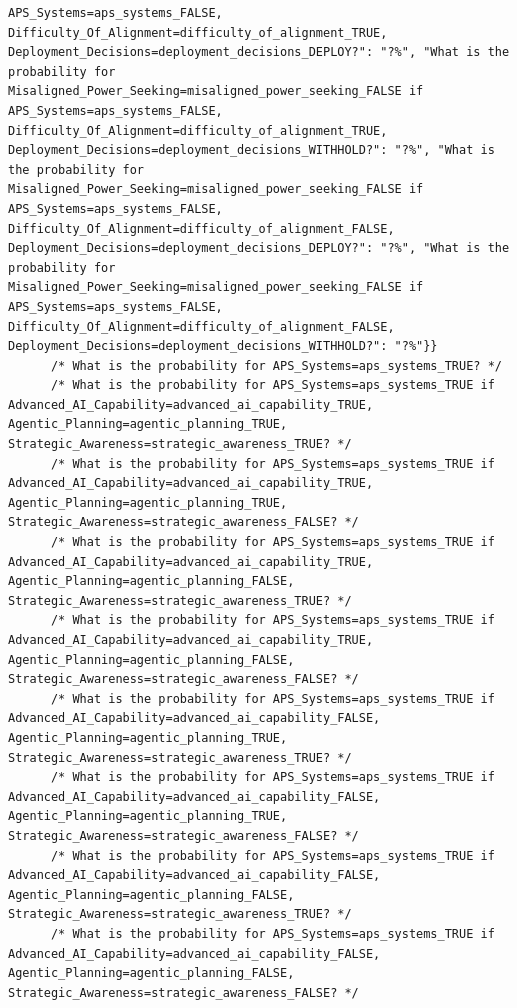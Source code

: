 \documentclass[
  11pt,
  letterpaper,
]{book}
\begin{document}
\begin{verbatim}
APS_Systems=aps_systems_FALSE, Difficulty_Of_Alignment=difficulty_of_alignment_TRUE, Deployment_Decisions=deployment_decisions_DEPLOY?": "?%", "What is the probability for Misaligned_Power_Seeking=misaligned_power_seeking_FALSE if APS_Systems=aps_systems_FALSE, Difficulty_Of_Alignment=difficulty_of_alignment_TRUE, Deployment_Decisions=deployment_decisions_WITHHOLD?": "?%", "What is the probability for Misaligned_Power_Seeking=misaligned_power_seeking_FALSE if APS_Systems=aps_systems_FALSE, Difficulty_Of_Alignment=difficulty_of_alignment_FALSE, Deployment_Decisions=deployment_decisions_DEPLOY?": "?%", "What is the probability for Misaligned_Power_Seeking=misaligned_power_seeking_FALSE if APS_Systems=aps_systems_FALSE, Difficulty_Of_Alignment=difficulty_of_alignment_FALSE, Deployment_Decisions=deployment_decisions_WITHHOLD?": "?%"}}
      /* What is the probability for APS_Systems=aps_systems_TRUE? */
      /* What is the probability for APS_Systems=aps_systems_TRUE if Advanced_AI_Capability=advanced_ai_capability_TRUE, Agentic_Planning=agentic_planning_TRUE, Strategic_Awareness=strategic_awareness_TRUE? */
      /* What is the probability for APS_Systems=aps_systems_TRUE if Advanced_AI_Capability=advanced_ai_capability_TRUE, Agentic_Planning=agentic_planning_TRUE, Strategic_Awareness=strategic_awareness_FALSE? */
      /* What is the probability for APS_Systems=aps_systems_TRUE if Advanced_AI_Capability=advanced_ai_capability_TRUE, Agentic_Planning=agentic_planning_FALSE, Strategic_Awareness=strategic_awareness_TRUE? */
      /* What is the probability for APS_Systems=aps_systems_TRUE if Advanced_AI_Capability=advanced_ai_capability_TRUE, Agentic_Planning=agentic_planning_FALSE, Strategic_Awareness=strategic_awareness_FALSE? */
      /* What is the probability for APS_Systems=aps_systems_TRUE if Advanced_AI_Capability=advanced_ai_capability_FALSE, Agentic_Planning=agentic_planning_TRUE, Strategic_Awareness=strategic_awareness_TRUE? */
      /* What is the probability for APS_Systems=aps_systems_TRUE if Advanced_AI_Capability=advanced_ai_capability_FALSE, Agentic_Planning=agentic_planning_TRUE, Strategic_Awareness=strategic_awareness_FALSE? */
      /* What is the probability for APS_Systems=aps_systems_TRUE if Advanced_AI_Capability=advanced_ai_capability_FALSE, Agentic_Planning=agentic_planning_FALSE, Strategic_Awareness=strategic_awareness_TRUE? */
      /* What is the probability for APS_Systems=aps_systems_TRUE if Advanced_AI_Capability=advanced_ai_capability_FALSE, Agentic_Planning=agentic_planning_FALSE, Strategic_Awareness=strategic_awareness_FALSE? */

\end{verbatim}
\end{document}
